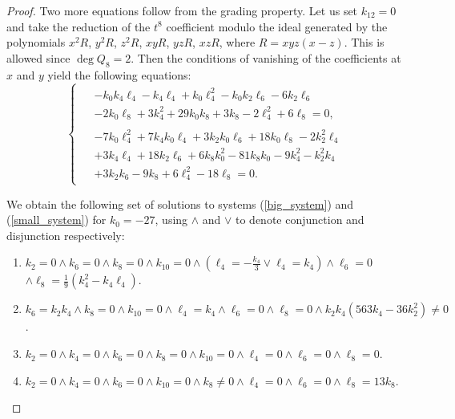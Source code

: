 \documentclass[14pt, dvipsnames]{extarticle}
\theoremstyle{definition}
\theoremstyle{definition}
\theoremstyle{remark}
\begin{document}
\begin{proof}
Two more equations follow from the grading property. Let us set $k_{12} = 0$ and take the reduction of the $t^8$ coefficient modulo the ideal generated by the polynomials $x^2R$, $y^2R$, $z^2R$, $xyR$, $yzR$, $xzR$, where $R = xyz(x-z)$. This is allowed since $\deg Q_8 = 2$. Then the conditions of vanishing of the coefficients at $x$ and $y$ yield the following equations:
\begin{equation}\label{small_system}\left\{ \begin{aligned}
\begin{aligned}&-k_{0}k_{4}\ell_{4}-k_{4}\ell_{4}+k_{0}\ell_{4}^{2}-k_{0}k_{2}\ell_{6}-6k_{2}\ell_{6} \\ &-2k_{0}\ell_{8}+3k_{4}^{2}+29k_{0}k_{8}+3k_{8}-2\ell_{4}^{2}+6\ell_{8} = 0,\end{aligned}\\
\begin{aligned}&-7k_{0}\ell_{4}^{2}+7k_{4}k_{0}\ell_{4}+3k_{2}k_{0}\ell_{6}+18k_{0}\ell_{8}-2k_{2}^{2}\ell_{4}\\ &+3k_{4}\ell_{4}+18k_{2}\ell_{6}+6k_{8}k_{0}^{2}-81k_{8}k_{0}-9k_{4}^{2}-k_{2}^{2}k_{4}\\ &+3k_{2}k_{6}-9k_{8}+6\ell_{4}^{2}-18\ell_{8} = 0.\end{aligned}
\end{aligned}\right.\end{equation} 


We obtain the following set of solutions to systems (\ref{big_system}) and (\ref{small_system}) for $k_0 = -27$, using $\land$ and $\lor$ to denote conjunction and disjunction respectively:

\begin{enumerate}[\bf 1)]

\item $k_2=0\land k_6=0\land k_8=0\land k_{10}=0\land \left(\ell_4=-\frac{k_4}{3}\lor \ell_4=k_4\right)\land \ell_6=0$ \\ $\land \ell_8=\frac{1}{9} \left(k_4^2-k_4 \ell_4\right)$. 

\item $k_6=k_2 k_4\land k_8=0\land k_{10}=0\land \ell_4=k_4\land \ell_6=0\land \ell_8=0\land k_2k_4(563 k_4-36 k_2^2)\neq 0$. 

\item $k_2=0\land k_4=0\land k_6=0\land k_8=0\land k_{10}=0\land \ell_4=0\land \ell_6=0\land \ell_8=0$. 

\item $k_2=0\land k_4=0\land k_6=0\land k_{10}=0\land k_8\neq 0\land \ell_4=0\land \ell_6=0\land \ell_8=13 k_8$. 


\end{enumerate}
\end{proof}
\end{document}
